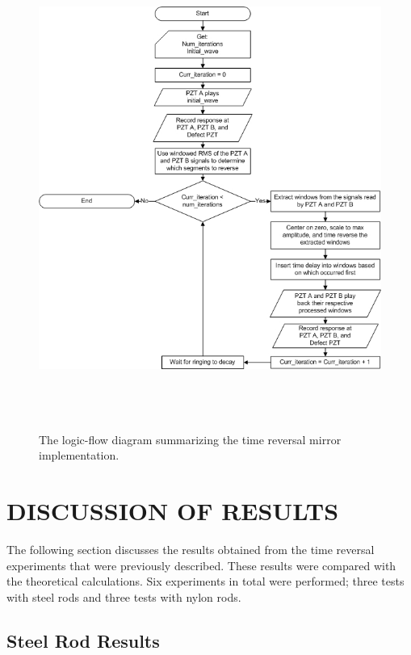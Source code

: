 \documentclass[11pt,letterpaper]{article}%
\begin{document}
\begin{figure}
\begin{center}
\includegraphics[width=15.7cm,height=15.75cm]{newFlow.jpg}
\end{center}
 \caption[flo1]
   { \label{flow}
The logic-flow diagram summarizing the time reversal mirror
implementation.}
\end{figure}


\section{DISCUSSION OF RESULTS}
\label{sect:res}

The following section discusses the results obtained from the time reversal experiments that were previously described. These results were compared with the theoretical calculations. Six experiments in total were performed; three tests with steel rods and three tests with nylon rods.

\subsection{Steel Rod Results}
\label{sect:steelRodResults}
\end{document}
